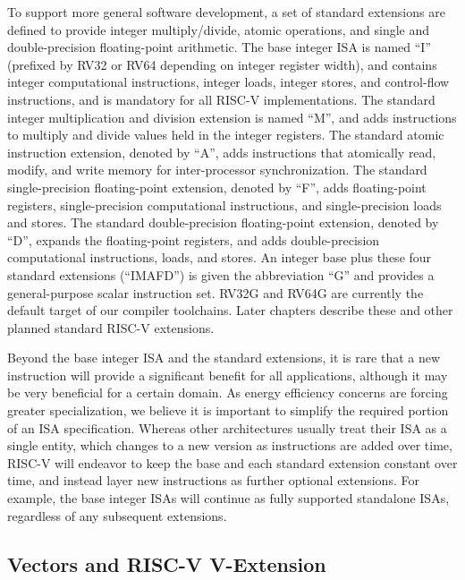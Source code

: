 To support more general software development, a set of standard extensions are deﬁned to provide integer multiply/divide, atomic operations, and single and double-precision ﬂoating-point arithmetic. The base integer ISA is named “I” (preﬁxed by RV32 or RV64 depending on integer register width), and contains integer computational instructions, integer loads, integer stores, and control-ﬂow instructions, and is mandatory for all RISC-V implementations. The standard integer multiplication and division extension is named “M”, and adds instructions to multiply and divide values held in the integer registers. The standard atomic instruction extension, denoted by “A”, adds instructions that atomically read, modify, and write memory for inter-processor synchronization. The standard single-precision ﬂoating-point extension, denoted by “F”, adds ﬂoating-point registers, single-precision computational instructions, and single-precision loads and stores. The standard double-precision ﬂoating-point extension, denoted by “D”, expands the ﬂoating-point registers, and adds double-precision computational instructions, loads, and stores. An integer base plus these four standard extensions (“IMAFD”) is given the abbreviation “G” and provides a general-purpose scalar instruction set. RV32G and RV64G are currently the default target of our compiler toolchains. Later chapters describe these and other planned standard RISC-V extensions.

Beyond the base integer ISA and the standard extensions, it is rare that a new instruction will provide a signiﬁcant beneﬁt for all applications, although it may be very beneﬁcial for a certain domain. As energy eﬃciency concerns are forcing greater specialization, we believe it is important to simplify the required portion of an ISA speciﬁcation. Whereas other architectures usually treat their ISA as a single entity, which changes to a new version as instructions are added over time, RISC-V will endeavor to keep the base and each standard extension constant over time, and instead layer new instructions as further optional extensions. For example, the base integer ISAs will continue as fully supported standalone ISAs, regardless of any subsequent extensions.



\subsection{Vectors and RISC-V V-Extension}

